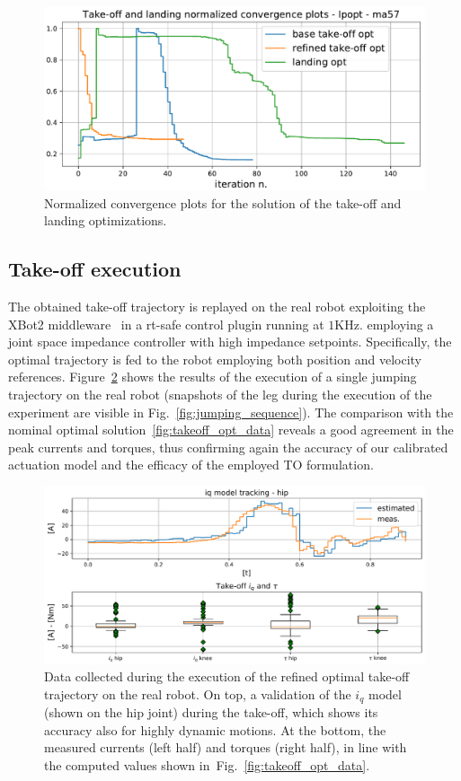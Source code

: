 \begin{figure}[t]
	\centering
	\includegraphics[width=1\columnwidth]{images/solver_conv_plots.pdf}
	\caption{Normalized convergence plots for the solution of the take-off and landing optimizations.\vspace{-0.3cm}}
	\label{fig:convergence_plots}
\end{figure}
\subsection{Take-off execution}
The obtained take-off trajectory is replayed on the real robot exploiting the XBot2 middleware~\cite{xbot::LAURENZI2023104379} in a rt-safe control plugin running at $1\mathrm{KHz}$. employing a joint space impedance controller with high impedance setpoints. Specifically, the optimal trajectory is fed to the robot employing both position and velocity references. Figure~\ref{fig:takeoff_execution} shows the results of the execution of a single jumping trajectory on the real robot (snapshots of the leg during the execution of the experiment are visible in Fig.~\ref{fig:jumping_sequence}). The comparison with the nominal optimal solution~\ref{fig:takeoff_opt_data} reveals a good agreement in the peak currents and torques, thus confirming again the accuracy of our calibrated actuation model and the efficacy of the employed TO formulation.
\begin{figure}[h]
	\centering
	\includegraphics[width=1\columnwidth]{images/hardware_saturation.pdf}
	\caption{Data collected during the execution of the refined optimal take-off trajectory on the real robot. On top, a validation of the $i_q$ model (shown on the hip joint) during the take-off, which shows its accuracy also for highly dynamic motions. At the bottom, the measured currents (left half) and torques (right half), in line with the computed values shown in~Fig.~\ref{fig:takeoff_opt_data}.\vspace{-0.3cm}}
	\label{fig:takeoff_execution}
\end{figure}
